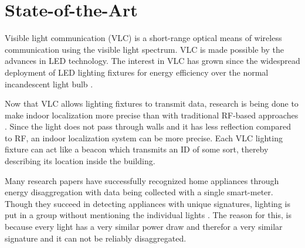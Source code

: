 
\chapter{State-of-the-Art}
\label{chp:state-of-the-art}



Visible light communication (VLC) is a short-range optical means of wireless communication using the visible light spectrum.
VLC is made possible by the advances in LED technology.
The interest in VLC has grown since the widespread deployment of LED lighting fixtures for energy efficiency over the normal incandescent light bulb \cite{rajagopal2012ieee}.


Now that VLC allows lighting fixtures to transmit data, research is being done to make indoor localization more precise than with traditional RF-based approaches \cite{Kuo:2014:LIP:2639108.2639109}.
Since the light does not pass through walls and it has less reflection compared to RF, an indoor localization system can be more precise.
Each VLC lighting fixture can act like a beacon which transmits an ID of some sort, thereby describing its location inside the building.


Many research papers have successfully recognized home appliances through energy disaggregation with data being collected with a single smart-meter.   
Though they succeed in detecting appliances with unique signatures, lighting is put in a group without mentioning the individual lights \cite{kolter2011redd}.
The reason for this, is because every light has a very similar power draw and therefor a very similar signature and it can not be reliably disaggregated.


